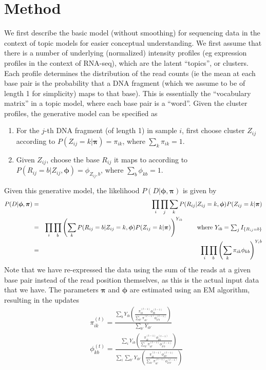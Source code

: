 \documentclass[11pt]{article}
\begin{document}
\section{Method}
We first describe the basic model (without smoothing) for sequencing data in the context of topic models for easier conceptual understanding. We first assume that there is a number of underlying (normalized) intensity profiles (eg expression profiles in the context of RNA-seq), which are the latent ``topics'', or clusters. Each profile determines the distribution of the read counts (ie the mean at each base pair is the probability that a DNA fragment (which we assume to be of length 1 for simplicity) maps to that base). This is essentially the ``vocabulary matrix'' in a topic model, where each base pair is a ``word''. Given the cluster profiles, the generative model can be specified as 
\begin{enumerate}
\item For the $j$-th DNA fragment (of length 1) in sample $i$, first choose cluster $Z_{ij}$ according to $P(Z_{ij}=k|\bm{\pi})=\pi_{ik}$, where $\sum_k\pi_{ik}=1$.
\item Given $Z_{ij}$, choose the base $R_{ij}$ it maps to according to $P(R_{ij}=b|Z_{ij},\bm{\phi})=\phi_{Z_{ij},b}$, where $\sum_b\phi_{kb}=1$.
\end{enumerate}
Given this generative model, the likelihood $P(D|\bm{\phi},\bm{\pi})$ is given by
\begin{eqnarray}
P(D|\bm{\phi},\bm{\pi})&=&\prod_i\prod_j\sum_k P(R_{ij}|Z_{ij}=k,\bm{\phi})P(Z_{ij}=k|\bm{\pi}) \notag\\
&=&\prod_i\prod_b\left(\sum_k P(R_{ij}=b|Z_{ij}=k,\bm{\phi})P(Z_{ij}=k|\bm{\pi})\right)^{Y_{ib}} \hspace{0.3in} \mbox{where $Y_{ib}=\sum_j I_{\{R_{ij}=b\}}$} \notag\\
&=&\prod_i\prod_b\left(\sum_k \pi_{ik}\phi_{kb}\right)^{Y_ib}\\
\end{eqnarray}
Note that we have re-expressed the data using the sum of the reads at a given base pair instead of the read position themselves, as this is the actual input data that we have. The parameters $\bm{\pi}$ and $\bm{\phi}$ are estimated using an EM algorithm, resulting in the updates
\begin{eqnarray}\label{eq:em_update}
&\pi_{ik}^{(t)}=\frac{\sum_b Y_{ib}\left(\frac{\pi_{ik}^{(t-1)}\phi_{kb}^{(t-1)}}{\sum_{k'}\pi_{ik'}^{(t-1)}\phi_{k'b}^{(t-1)}}\right)}{\sum_{b'}Y_{ib'}}\\
&\phi_{kb}^{(t)}=\frac{\sum_i Y_{ib}\left(\frac{\pi_{ik}^{(t-1)}\phi_{kb}^{(t-1)}}{\sum_{k'}\pi_{ik'}^{(t-1)}\phi_{k'b}^{(t-1)}}\right)}{\sum_i\sum_{b'} Y_{ib'}\left(\frac{\pi_{ik}^{(t-1)}\phi_{kb'}^{(t-1)}}{\sum_{k'}\pi_{ik'}^{(t-1)}\phi_{k'b'}^{(t-1)}}\right)}
\end{eqnarray}
\end{document}
